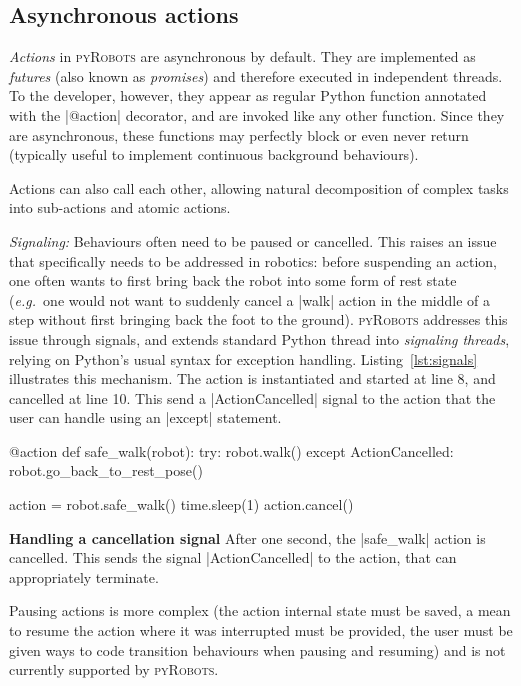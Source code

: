 \documentclass[a4paper, 10pt, conference]{ieeeconf}      %
\newcommand{\eg}{{\textit{e.g.\ }}}
\newcommand{\pyRobots}{\textsc{pyRobots}}
\begin{document}
\subsection{Asynchronous actions}

\emph{Actions} in \pyRobots{} are asynchronous by default. They are implemented as
\emph{futures} (also known as \emph{promises}) and therefore executed in
independent threads. To the developer, however, they appear as regular Python
function annotated with the \python|@action| decorator, and are invoked
like any other function.  Since they are asynchronous, these functions may
perfectly block or even never return (typically useful to implement continuous
background behaviours).

Actions can also call each other, allowing natural decomposition of complex
tasks into sub-actions and atomic actions.

\emph{Signaling:} Behaviours often need to be paused or cancelled.  This raises
an issue that specifically needs to be addressed in robotics: before suspending
an action, one often wants to first bring back the robot into some form of rest
state (\eg one would not want to suddenly cancel a \python|walk| action in the
middle of a step without first bringing back the foot to the ground). \pyRobots{}
addresses this issue through signals, and extends standard Python thread into
\emph{signaling threads}, relying on Python's usual syntax for exception
handling. Listing~\ref{lst:signals} illustrates this mechanism. The action is
instantiated and started at line 8, and cancelled at line 10. This send a
\python|ActionCancelled| signal to the action that the user can handle using an
\python|except| statement.

\begin{listing}[H]
\begin{pythoncode}
    @action
    def safe_walk(robot):
      try:
        robot.walk()
      except ActionCancelled:
        robot.go_back_to_rest_pose()

    action = robot.safe_walk()
    time.sleep(1)
    action.cancel()
\end{pythoncode}
\caption{\textbf{Handling a cancellation signal} After one second, the
\python|safe_walk| action is cancelled. This sends the signal
\python|ActionCancelled| to the action, that can appropriately terminate.}
\label{lst:signals}
\end{listing}

Pausing actions is more complex (the action internal state must be saved, a mean
to resume the action where it was interrupted must be provided, the user must be
given ways to code transition behaviours when pausing and resuming) and is not
currently supported by \pyRobots{}.
\end{document}
